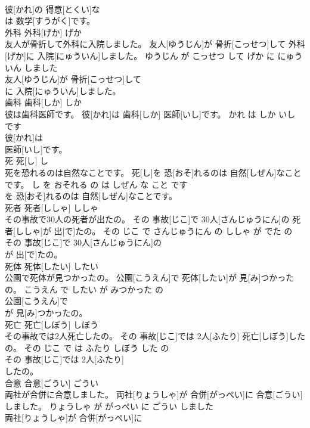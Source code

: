 \documentclass[8pt]{extreport}
\begin{document}
\begin{CJK}{UTF8}{min}
\\	彼[かれ]の 得意[とくい]な
\\	は 数学[すうがく]です。			
\\	外科	外科[げか]	げか	
\\	友人が骨折して外科に入院しました。	友人[ゆうじん]が 骨折[こっせつ]して 外科[げか]に 入院[にゅういん]しました。	ゆうじん が こっせつ して げか に にゅういん しました	
\\	友人[ゆうじん]が 骨折[こっせつ]して
\\	に 入院[にゅういん]しました。			
\\	歯科	歯科[しか]	しか	
\\	彼は歯科医師です。	彼[かれ]は 歯科[しか] 医師[いし]です。	かれ は しか いし です	
\\	彼[かれ]は
\\	医師[いし]です。			
\\	死	死[し]	し	
\\	死を恐れるのは自然なことです。	死[し]を 恐[おそ]れるのは 自然[しぜん]なことです。	し を おそれる の は しぜん な こと です	
\\	を 恐[おそ]れるのは 自然[しぜん]なことです。			
\\	死者	死者[ししゃ]	ししゃ	
\\	その事故で30人の死者が出たの。	その 事故[じこ]で 30人[さんじゅうにん]の 死者[ししゃ]が 出[で]たの。	その じこ で さんじゅうにん の ししゃ が でた の	
\\	その 事故[じこ]で 30人[さんじゅうにん]の
\\	が 出[で]たの。			
\\	死体	死体[したい]	したい	
\\	公園で死体が見つかったの。	公園[こうえん]で 死体[したい]が 見[み]つかったの。	こうえん で したい が みつかった の	
\\	公園[こうえん]で
\\	が 見[み]つかったの。			
\\	死亡	死亡[しぼう]	しぼう	
\\	その事故では2人死亡したの。	その 事故[じこ]では 2人[ふたり] 死亡[しぼう]したの。	その じこ で は ふたり しぼう した の	
\\	その 事故[じこ]では 2人[ふたり]
\\	したの。			
\\	合意	合意[ごうい]	ごうい	
\\	両社が合併に合意しました。	両社[りょうしゃ]が 合併[がっぺい]に 合意[ごうい]しました。	りょうしゃ が がっぺい に ごうい しました	
\\	両社[りょうしゃ]が 合併[がっぺい]に

\end{CJK}
\end{document}
